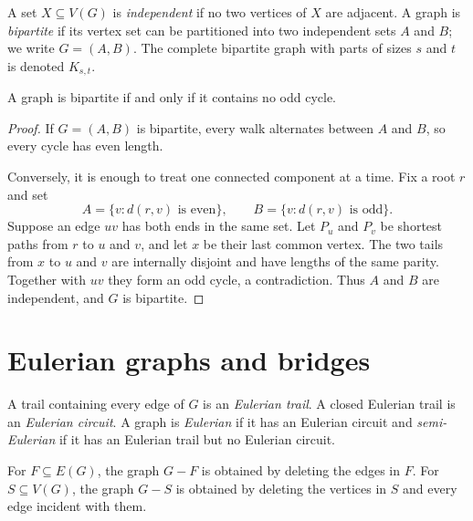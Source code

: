 \begin{notedefinition}
A set $X\subseteq V(G)$ is \emph{independent} if no two vertices of $X$ are adjacent.  A graph is \emph{bipartite} if its vertex set can be partitioned into two independent sets $A$ and $B$; we write $G=(A,B)$.  The complete bipartite graph with parts of sizes $s$ and $t$ is denoted $K_{s,t}$.
\end{notedefinition}
\begin{notetheorem}
A graph is bipartite if and only if it contains no odd cycle.
\end{notetheorem}
\begin{proof}
If $G=(A,B)$ is bipartite, every walk alternates between $A$ and $B$, so every cycle has even length.

Conversely, it is enough to treat one connected component at a time.  Fix a root $r$ and set
\[
  A=\{v:d(r,v)\text{ is even}\},
  \qquad
  B=\{v:d(r,v)\text{ is odd}\}.
\]
Suppose an edge $uv$ has both ends in the same set.  Let $P_u$ and $P_v$ be shortest paths from $r$ to $u$ and $v$, and let $x$ be their last common vertex.  The two tails from $x$ to $u$ and $v$ are internally disjoint and have lengths of the same parity.  Together with $uv$ they form an odd cycle, a contradiction.  Thus $A$ and $B$ are independent, and $G$ is bipartite.
\end{proof}
\section{Eulerian graphs and bridges}

\begin{notedefinition}
A trail containing every edge of $G$ is an \emph{Eulerian trail}.  A closed Eulerian trail is an \emph{Eulerian circuit}.  A graph is \emph{Eulerian} if it has an Eulerian circuit and \emph{semi-Eulerian} if it has an Eulerian trail but no Eulerian circuit.
\end{notedefinition}

\begin{notedefinition}
For $F\subseteq E(G)$, the graph $G-F$ is obtained by deleting the edges in $F$.  For $S\subseteq V(G)$, the graph $G-S$ is obtained by deleting the vertices in $S$ and every edge incident with them.
\end{notedefinition}

